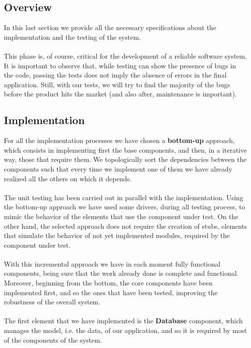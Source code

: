 \documentclass{article}
\begin{document}
\subsection{Overview}
In this last section we provide all the necessary specifications about the
implementation and the testing of the system.
\\\\
This phase is, of course, critical for the development of a reliable software
system. It is important to observe that, while testing can show the presence of
bugs in the code, passing the tests does not imply the absence of errors in the
final application. Still, with our tests, we will try to find the majority of
the bugs before the product hits the market (and also after, maintenance is
important).

\subsection{Implementation}
For all the implementation processes we have chosen a \textbf{bottom-up}
approach, which consists in implementing first the base components, and then, in
a iterative way, those that require them. We topologically sort the dependencies
between the components such that every time we implement one of them we have
already realized all the others on which it depends.
\\\\
The unit testing has been carried out in parallel with the implementation. Using
the bottom-up approach we have used some drivers, during all testing process, to
mimic the behavior of the elements that use the component under test. On
the other hand, the selected approach does not require the creation of stubs,
elements that simulate the behavior of not yet implemented modules, required by
the component under test.
\\\\
With this incremental approach we have in each moment fully functional
components, being sure that the work already done is complete and functional.
Moreover, beginning from the bottom, the core components have been implemented
first, and so the ones that have been tested, improving the robustness of the
overall system.
\\\\
The first element that we have implemented is the \textbf{Database} component,
which manages the model, i.e. the data, of our application, and so it is
required by most of the components of the system.
\\\\
\end{document}
